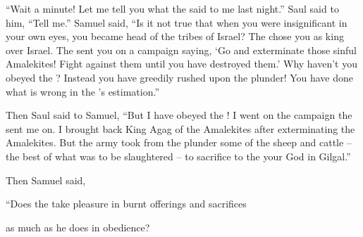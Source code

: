 {“Wait a minute! Let me tell
you what
the {}
said
to
me last night.”
Saul said
to him, “Tell me.”
Samuel
said,
“Is it not
true that when you were insignificant
in your
own eyes,
you became head
of the tribes
of Israel? The
{}
chose
you
as king
over
Israel.
The
{}
sent
you on a campaign
saying,
‘Go
and exterminate
those sinful
Amalekites! Fight
against them until
you have destroyed them.’
Why
haven’t
you obeyed
the {}? Instead you have greedily
rushed upon the plunder! You have done
what is wrong
in the
{}’s
estimation.”
\par }{\PP {}Then Saul
said to
Samuel,
“But I have
obeyed
the {}! I went
on
the campaign
the {}
sent
me on. I brought
back King
Agag
of the
Amalekites
after exterminating
the Amalekites.
But
the army
took
from the plunder
some of the sheep
and cattle
– the best
of what was to be slaughtered
– to sacrifice
to the
{}
your God
in Gilgal.”
\par }{\PP {}Then Samuel
said,
\par }{\Q “Does the
{}
take pleasure
in burnt offerings
and sacrifices
\par }{\Q as much as he does in obedience?

}
